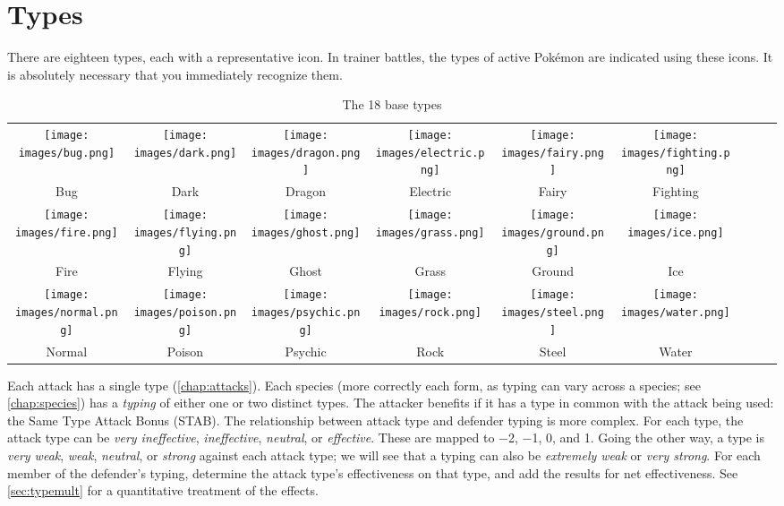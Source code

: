 \chapter{Types\label{chap:types}}
\nopagecolor{}There are eighteen types, each with a representative icon.
In trainer battles, the types of active Pokémon are indicated
 using these icons.
It is absolutely necessary that you immediately recognize them.

\begin{table}[ht!]
\centering
\begin{tabular}{c c c c c c c c c}
\texttt{[image: images/bug.png]} &
\texttt{[image: images/dark.png]} &
\texttt{[image: images/dragon.png]} &
\texttt{[image: images/electric.png]} &
\texttt{[image: images/fairy.png]} &
\texttt{[image: images/fighting.png]} \\
Bug & Dark & Dragon & Electric & Fairy & Fighting \\
\texttt{[image: images/fire.png]} &
\texttt{[image: images/flying.png]} &
\texttt{[image: images/ghost.png]} &
\texttt{[image: images/grass.png]} &
\texttt{[image: images/ground.png]} &
\texttt{[image: images/ice.png]} \\
Fire & Flying & Ghost & Grass & Ground & Ice \\
\texttt{[image: images/normal.png]} &
\texttt{[image: images/poison.png]} &
\texttt{[image: images/psychic.png]} &
\texttt{[image: images/rock.png]} &
\texttt{[image: images/steel.png]} &
\texttt{[image: images/water.png]} \\
Normal & Poison & Psychic & Rock & Steel & Water \\
\end{tabular}
\caption{The 18 base types\label{table:basetypes}}
\end{table}

Each attack has a single type (\autoref{chap:attacks}).
Each species (more correctly each form, as typing can vary across a species; see \autoref{chap:species})
  has a \textit{typing} of either one or two distinct types.
The attacker benefits if it has a type in common with the attack being used:
  the Same Type Attack Bonus (STAB).
The relationship between attack type and defender typing is more complex.
For each type, the attack type can be \textit{very ineffective},
  \textit{ineffective}, \textit{neutral}, or \textit{effective}.
These are mapped to −2, −1, 0, and 1.
Going the other way, a type is \textit{very weak}, \textit{weak},
  \textit{neutral}, or \textit{strong} against each attack type;
  we will see that a typing can also be \textit{extremely weak} or
  \textit{very strong}.
For each member of the defender's typing, determine the attack type's effectiveness
  on that type, and add the results for net effectiveness.
See \autoref{sec:typemult} for a quantitative treatment of the effects.

